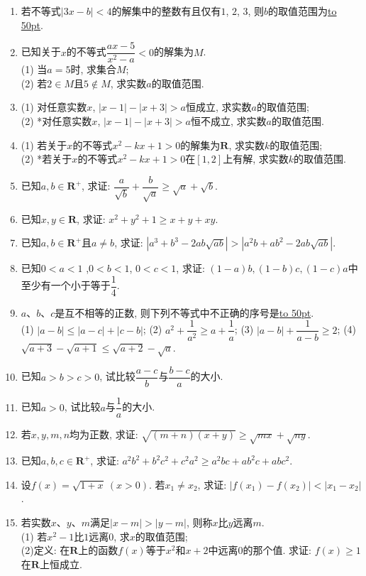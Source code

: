 \documentclass[10pt,a4paper]{article}
\newcommand{\blank}[1]{\underline{\hbox to #1pt{}}}
\begin{document}
\begin{enumerate}[1.]
\item 若不等式$|3x-b|<4$的解集中的整数有且仅有$1$, $2$, $3$, 则$b$的取值范围为\blank{50}.
\item 已知关于$x$的不等式$\dfrac{ax-5}{x^2-a}<0$的解集为$M$.\\
(1) 当$a=5$时, 求集合$M$;\\
(2) 若$2\in M$且$5\notin M$, 求实数$a$的取值范围.
\item (1) 对任意实数$x$, $|x-1|-|x+3|>a$恒成立, 求实数$a$的取值范围;\\
(2) *对任意实数$x$, $|x-1|-|x+3|>a$恒不成立, 求实数$a$的取值范围.
\item (1) 若关于$x$的不等式$x^2-kx+1>0$的解集为$\mathbf{R}$, 求实数$k$的取值范围;\\
(2) *若关于$x$的不等式$x^2-kx+1>0$在$[1,2]$上有解, 求实数$k$的取值范围.

\item 已知$a,b\in \mathbf{R}^+$, 求证: $\dfrac a{\sqrt b}+\dfrac b{\sqrt a}\ge \sqrt a+\sqrt b$.
\item 已知$x,y\in \mathbf{R}$, 求证: $x^2+y^2+1\ge x+y+xy$.
\item 已知$a,b\in \mathbf{R}^+$且$a\ne b$, 求证: $|a^3+b^3-2ab\sqrt{ab}|>|a^2b+ab^2-2ab\sqrt{ab}|$.
\item 已知$0<a<1$ ,$0<b<1$, $0<c<1$, 求证: $(1-a)b,(1-b)c,(1-c)a$中至少有一个小于等于$\dfrac 14$.
\item $a$、$b$、$c$是互不相等的正数, 则下列不等式中不正确的序号是\blank{50}.\\
(1) $|a-b|\le |a-c|+|c-b|$; (2) ${a^2}+\dfrac 1{a^2}\ge a+\dfrac 1a$; (3) $|a-b|+\dfrac 1{a-b}\ge 2$; (4) $\sqrt{a+3}-\sqrt{a+1}\le \sqrt{a+2}-\sqrt a$.
\item 已知$a>b>c>0$, 试比较$\dfrac{a-c}b$与$\dfrac{b-c}a$的大小.
\item 已知$a>0$, 试比较$a$与$\dfrac 1a$的大小.
\item 若$x,y,m,n$均为正数, 求证: $\sqrt{(m+n)(x+y)}\ge \sqrt{mx}+\sqrt{ny}$.
\item 已知$a,b,c\in \mathbf{R}^+$, 求证: $a^2b^2+b^2c^2+c^2a^2\ge a^2bc+ab^2c+abc^2$.
\item 设$f(x)=\sqrt{1+x}\ (x>0)$. 若$x_1\ne x_2$, 求证: $|f(x_1)-f(x_2)|<|x_1-x_2|$.
\item 若实数$x$、$y$、$m$满足$|x-m|>|y-m|$, 则称$x$比$y$远离$m$.\\
(1) 若$x^2-1$比$1$远离$0$, 求$x$的取值范围;\\
(2)定义: 在$\mathbf{R}$上的函数$f(x)$等于$x^2$和$x+2$中远离$0$的那个值. 求证: $f(x)\ge 1$在$\mathbf{R}$上恒成立.









 


\end{enumerate}
\end{document}
